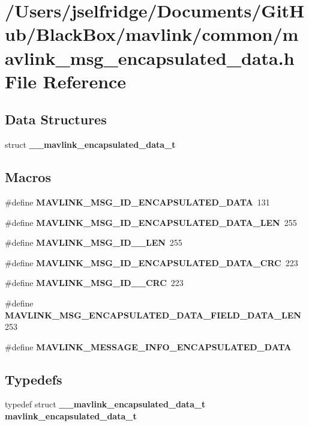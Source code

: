 \section{/\+Users/jselfridge/\+Documents/\+Git\+Hub/\+Black\+Box/mavlink/common/mavlink\+\_\+msg\+\_\+encapsulated\+\_\+data.h File Reference}
\label{mavlink__msg__encapsulated__data_8h}
\subsection*{Data Structures}
\begin{DoxyCompactItemize}
\item 
struct \textbf{ \+\_\+\+\_\+mavlink\+\_\+encapsulated\+\_\+data\+\_\+t}
\end{DoxyCompactItemize}
\subsection*{Macros}
\begin{DoxyCompactItemize}
\item 
\#define \textbf{ M\+A\+V\+L\+I\+N\+K\+\_\+\+M\+S\+G\+\_\+\+I\+D\+\_\+\+E\+N\+C\+A\+P\+S\+U\+L\+A\+T\+E\+D\+\_\+\+D\+A\+TA}~131
\item 
\#define \textbf{ M\+A\+V\+L\+I\+N\+K\+\_\+\+M\+S\+G\+\_\+\+I\+D\+\_\+\+E\+N\+C\+A\+P\+S\+U\+L\+A\+T\+E\+D\+\_\+\+D\+A\+T\+A\+\_\+\+L\+EN}~255
\item 
\#define \textbf{ M\+A\+V\+L\+I\+N\+K\+\_\+\+M\+S\+G\+\_\+\+I\+D\+\_\+\_\+\+L\+EN}~255
\item 
\#define \textbf{ M\+A\+V\+L\+I\+N\+K\+\_\+\+M\+S\+G\+\_\+\+I\+D\+\_\+\+E\+N\+C\+A\+P\+S\+U\+L\+A\+T\+E\+D\+\_\+\+D\+A\+T\+A\+\_\+\+C\+RC}~223
\item 
\#define \textbf{ M\+A\+V\+L\+I\+N\+K\+\_\+\+M\+S\+G\+\_\+\+I\+D\+\_\+\_\+\+C\+RC}~223
\item 
\#define \textbf{ M\+A\+V\+L\+I\+N\+K\+\_\+\+M\+S\+G\+\_\+\+E\+N\+C\+A\+P\+S\+U\+L\+A\+T\+E\+D\+\_\+\+D\+A\+T\+A\+\_\+\+F\+I\+E\+L\+D\+\_\+\+D\+A\+T\+A\+\_\+\+L\+EN}~253
\item 
\#define \textbf{ M\+A\+V\+L\+I\+N\+K\+\_\+\+M\+E\+S\+S\+A\+G\+E\+\_\+\+I\+N\+F\+O\+\_\+\+E\+N\+C\+A\+P\+S\+U\+L\+A\+T\+E\+D\+\_\+\+D\+A\+TA}
\end{DoxyCompactItemize}
\subsection*{Typedefs}
\begin{DoxyCompactItemize}
\item 
typedef struct \textbf{ \+\_\+\+\_\+mavlink\+\_\+encapsulated\+\_\+data\+\_\+t} \textbf{ mavlink\+\_\+encapsulated\+\_\+data\+\_\+t}
\end{DoxyCompactItemize}


